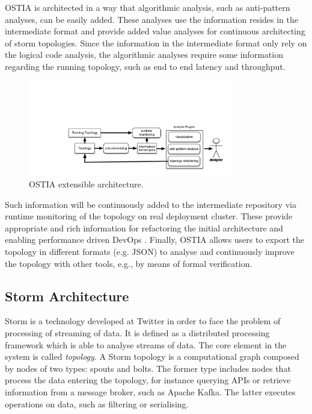 OSTIA is architected in a way that algorithmic analysis, such as anti-pattern
analyses, can be easily added. These analyses use the information resides in the
intermediate format and provide added value analyses for continuous architecting
of storm topologies. Since the information in the intermediate format only rely
on the logical code analysis, the algorithmic analyses require some
information regarding the running topology, such as end to end latency and
throughput.

\begin{figure}[H]
	\begin{center}
		\includegraphics[width=9cm]{images/ostia-arch}
		\caption{OSTIA extensible architecture.}\label{archostia}
	\end{center}
\end{figure}

Such information will be continuously added to the intermediate repository via
runtime monitoring of the topology on real deployment cluster. These provide
appropriate and rich information for refactoring the initial architecture and
enabling performance driven DevOps \cite{brunnert2015performance}.
Finally, OSTIA allows users to export the topology in different formats
(e.g. JSON) to analyse and continuously improve the topology with other tools, e.g., by means of formal verification.

\subsection{Storm Architecture}

Storm is a technology developed at Twitter \cite{toshniwal2014storm} in order to
face the problem of processing of streaming of data. It is defined as a
distributed processing framework which is able to analyse streams of data. The
core element in the system is called \emph{topology}. A Storm topology is a
computational graph composed by nodes of two types: spouts and bolts. The former
type includes nodes that process the data entering the topology, for instance
querying APIs or retrieve information from a message broker, such as Apache
Kafka. The latter executes operations on data, such as filtering or serialising.

